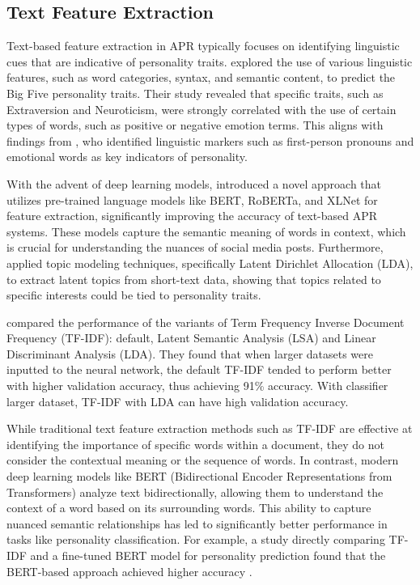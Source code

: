 \subsection{Text Feature Extraction}

Text-based feature extraction in APR typically focuses on identifying linguistic cues that are indicative of personality traits. \citet{Mairesse2007} explored the use of various linguistic features, such as word categories, syntax, and semantic content, to predict the Big Five personality traits. Their study revealed that specific traits, such as Extraversion and Neuroticism, were strongly correlated with the use of certain types of words, such as positive or negative emotion terms. This aligns with findings from \citet{Pennebaker1999}, who identified linguistic markers such as first-person pronouns and emotional words as key indicators of personality.

With the advent of deep learning models, \citet{Christian2021} introduced a novel approach that utilizes pre-trained language models like BERT, RoBERTa, and XLNet for feature extraction, significantly improving the accuracy of text-based APR systems. These models capture the semantic meaning of words in context, which is crucial for understanding the nuances of social media posts. Furthermore, \citet{Albalawi2020} applied topic modeling techniques, specifically Latent Dirichlet Allocation (LDA), to extract latent topics from short-text data, showing that topics related to specific interests could be tied to personality traits.

\citet{Dzisevic_Sesok_2019} compared the performance of the variants of Term Frequency Inverse Document  Frequency (TF-IDF): default, Latent Semantic Analysis (LSA) and Linear Discriminant Analysis (LDA). They found that when larger datasets were inputted to the neural network, the default TF-IDF tended to perform better with higher validation accuracy, thus achieving 91\% accuracy. With classifier larger dataset, TF-IDF with LDA can have high validation accuracy.

While traditional text feature extraction methods such as TF-IDF are effective at identifying the importance of specific words within a document, they do not consider the contextual meaning or the sequence of words. In contrast, modern deep learning models like BERT (Bidirectional Encoder Representations from Transformers) analyze text bidirectionally, allowing them to understand the context of a word based on its surrounding words. This ability to capture nuanced semantic relationships has led to significantly better performance in tasks like personality classification. For example, a study directly comparing TF-IDF and a fine-tuned BERT model for personality prediction found that the BERT-based approach achieved higher accuracy \citep{Zhang_2023}. 


